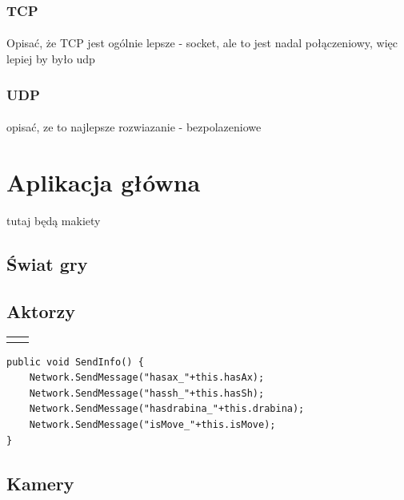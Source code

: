 \documentclass[12pt]{article}
\begin{document}
{{\subsubsection{TCP}
\paragraph{}
{\color{red}Opisać, że TCP jest ogólnie lepsze - socket, ale to jest nadal połączeniowy, więc lepiej by było udp}
\subsubsection{UDP}
\paragraph{}
{\color{red}opisać, ze to najlepsze rozwiazanie - bezpolazeniowe}

\newpage
\section{Aplikacja główna}


{\color{red}tutaj będą makiety}

\subsection{Świat gry}
\subsection{Aktorzy}

\begin{center}

 \begin{tabular}{|c|c|}
 \hline  
  &   \\
  \hline   
  &   \\
  \hline   
\end{tabular}
\end{center}

\begin{lstlisting}[language=CSharp]
public void SendInfo() {
	Network.SendMessage("hasax_"+this.hasAx);
	Network.SendMessage("hassh_"+this.hasSh);
	Network.SendMessage("hasdrabina_"+this.drabina);
	Network.SendMessage("isMove_"+this.isMove);
}
\end{lstlisting}

\subsection{Kamery}
}}
\end{document}
